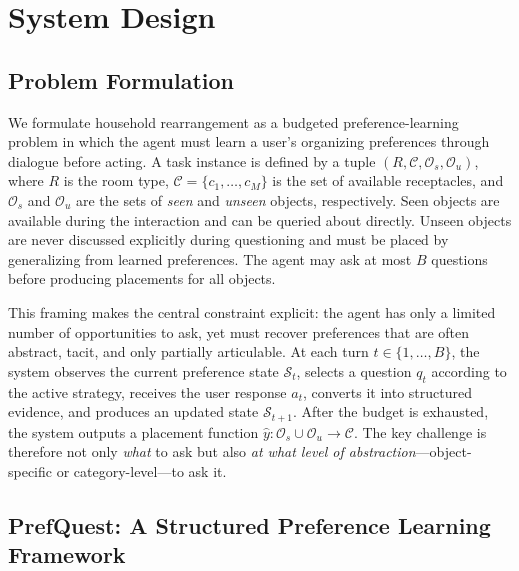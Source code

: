 \documentclass[manuscript,review,anonymous]{acmart}
\newcommand{\revstart}{\color{revcolor}}  %
\renewcommand{\revstart}{}
\begin{document}
\section{System Design}
\label{sec:system-design}
{\revstart

\subsection{Problem Formulation}
\label{sec:task-formulation}

We formulate household rearrangement as a budgeted preference-learning problem in which the agent must learn a user's organizing preferences through dialogue before acting. A task instance is defined by a tuple $(R, \mathcal{C}, \mathcal{O}_s, \mathcal{O}_u)$, where $R$ is the room type, $\mathcal{C} = \{c_1, \dots, c_M\}$ is the set of available receptacles, and $\mathcal{O}_s$ and $\mathcal{O}_u$ are the sets of \textit{seen} and \textit{unseen} objects, respectively. Seen objects are available during the interaction and can be queried about directly. Unseen objects are never discussed explicitly during questioning and must be placed by generalizing from learned preferences. The agent may ask at most $B$ questions before producing placements for all objects.

This framing makes the central constraint explicit: the agent has only a limited number of opportunities to ask, yet must recover preferences that are often abstract, tacit, and only partially articulable. At each turn $t \in \{1, \dots, B\}$, the system observes the current preference state $\mathcal{S}_t$, selects a question $q_t$ according to the active strategy, receives the user response $a_t$, converts it into structured evidence, and produces an updated state $\mathcal{S}_{t+1}$. After the budget is exhausted, the system outputs a placement function $\hat{y}: \mathcal{O}_s \cup \mathcal{O}_u \rightarrow \mathcal{C}$. The key challenge is therefore not only \textit{what} to ask but also \textit{at what level of abstraction}---object-specific or category-level---to ask it.

\subsection{PrefQuest: A Structured Preference Learning Framework}

}
\end{document}
